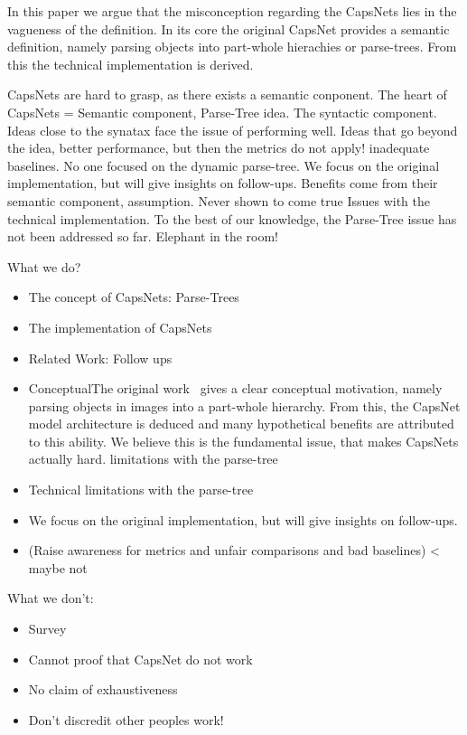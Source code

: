 \documentclass{article}
\begin{document}
In this paper we argue that the misconception regarding the CapsNets lies in the vagueness of the definition.
In its core the original CapsNet provides a semantic definition, namely parsing objects into part-whole hierachies or parse-trees.
From this the technical implementation is derived.


CapsNets are hard to grasp, as there exists a semantic conponent.
The heart of CapsNets = Semantic component, Parse-Tree idea.
The syntactic component.
Ideas close to the synatax face the issue of performing well.
Ideas that go beyond the idea, better performance, but then the metrics do not apply! inadequate baselines.
No one focused on the dynamic parse-tree.
We focus on the original implementation, but will give insights on follow-ups.
Benefits come from their semantic component, assumption. Never shown to come true
Issues with the technical implementation.
To the best of our knowledge, the Parse-Tree issue has not been addressed so far. Elephant in the room!

What we do?
\begin{itemize}
	\item The concept of CapsNets: Parse-Trees
	\item The implementation of CapsNets
	\item Related Work: Follow ups
	\item ConceptualThe original work~\cite{nips/SabourFH17} gives a clear conceptual motivation, namely parsing objects in images into a part-whole hierarchy.
	From this, the CapsNet model architecture is deduced and many hypothetical benefits are attributed to this ability.
	We believe this is the fundamental issue, that makes CapsNets actually hard. limitations with the parse-tree
	\item Technical limitations with the parse-tree
	\item We focus on the original implementation, but will give insights on follow-ups.
	\item (Raise awareness for metrics and unfair comparisons and bad baselines) < maybe not
\end{itemize}

What we don't:
\begin{itemize}
	\item Survey
	\item Cannot proof that CapsNet do not work
	\item No claim of exhaustiveness
	\item Don't discredit other peoples work!
\end{itemize}
\end{document}
